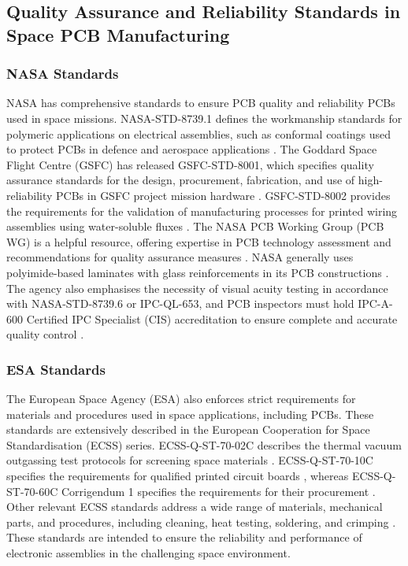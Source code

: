 \subsection{Quality Assurance and Reliability Standards in Space PCB Manufacturing}

\subsubsection{NASA Standards}
NASA has comprehensive standards to ensure PCB quality and reliability PCBs used in space missions. 
NASA-STD-8739.1 defines the workmanship standards for polymeric applications on electrical assemblies, such as conformal coatings used to protect PCBs in defence and aerospace applications \cite{RefWorks:2021nasa}. 
The Goddard Space Flight Centre (GSFC) has released GSFC-STD-8001, which specifies quality assurance standards for the design, procurement, fabrication, and use of high-reliability PCBs in GSFC project mission hardware \cite{RefWorks:2019standard}. 
GSFC-STD-8002 provides the requirements for the validation of manufacturing processes for printed wiring assemblies using water-soluble fluxes \cite{RefWorks:2015standard}. 
The NASA PCB Working Group (PCB WG) is a helpful resource, offering expertise in PCB technology assessment and recommendations for quality assurance measures \cite{RefWorks:2025designing}. 
NASA generally uses polyimide-based laminates with glass reinforcements in its PCB constructions \cite{RefWorks:systems2025designing}. 
The agency also emphasises the necessity of visual acuity testing in accordance with NASA-STD-8739.6 or IPC-QL-653, and PCB inspectors must hold IPC-A-600 Certified IPC Specialist (CIS) accreditation to ensure complete and accurate quality control \cite{RefWorks:2019standard}.
\subsubsection{ESA Standards}
The European Space Agency (ESA) also enforces strict requirements for materials and procedures used in space applications, including PCBs. 
These standards are extensively described in the European Cooperation for Space Standardisation (ECSS) series. 
ECSS-Q-ST-70-02C describes the thermal vacuum outgassing test protocols for screening space materials \cite{RefWorks:leverett2024satellite}. 
ECSS-Q-ST-70-10C specifies the requirements for qualified printed circuit boards \cite{RefWorks:ecss2008ecss-q-st-70-02c}, whereas ECSS-Q-ST-70-60C Corrigendum 1 specifies the requirements for their procurement \cite{RefWorks:ecss2019list}. 
Other relevant ECSS standards address a wide range of materials, mechanical parts, and procedures, including cleaning, heat testing, soldering, and crimping \cite{RefWorks:ecss2019list}. 
These standards are intended to ensure the reliability and performance of electronic assemblies in the challenging space environment.

